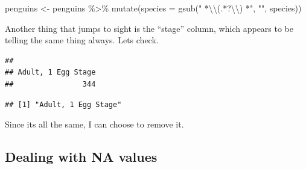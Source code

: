 \documentclass[
]{book}
\newenvironment{Shaded}{\begin{snugshade}}{\end{snugshade}}
\newcommand{\AttributeTok}[1]{\textcolor[rgb]{0.77,0.63,0.00}{#1}}
\newcommand{\ConstantTok}[1]{\textcolor[rgb]{0.00,0.00,0.00}{#1}}
\newcommand{\FunctionTok}[1]{\textcolor[rgb]{0.00,0.00,0.00}{#1}}
\newcommand{\NormalTok}[1]{#1}
\newcommand{\OtherTok}[1]{\textcolor[rgb]{0.56,0.35,0.01}{#1}}
\newcommand{\SpecialCharTok}[1]{\textcolor[rgb]{0.00,0.00,0.00}{#1}}
\newcommand{\StringTok}[1]{\textcolor[rgb]{0.31,0.60,0.02}{#1}}
\begin{document}
\begin{Shaded}
\begin{Highlighting}[]
\NormalTok{penguins }\OtherTok{\textless{}{-}}\NormalTok{ penguins }\SpecialCharTok{\%\textgreater{}\%} 
  \FunctionTok{mutate}\NormalTok{(}\AttributeTok{species =} \FunctionTok{gsub}\NormalTok{(}\StringTok{" *}\SpecialCharTok{\textbackslash{}\textbackslash{}}\StringTok{(.*?}\SpecialCharTok{\textbackslash{}\textbackslash{}}\StringTok{) *"}\NormalTok{, }\StringTok{""}\NormalTok{, species))}
\end{Highlighting}
\end{Shaded}

Another thing that jumps to sight is the ``stage'' column, which appears to be telling the same thing always.
Lets check.

\begin{Shaded}
\end{Shaded}

\begin{verbatim}
## 
## Adult, 1 Egg Stage 
##                344
\end{verbatim}

\begin{Shaded}
\end{Shaded}

\begin{verbatim}
## [1] "Adult, 1 Egg Stage"
\end{verbatim}

Since its all the same, I can choose to remove it.

\begin{Shaded}
\end{Shaded}

\hypertarget{dealing-with-na-values}{%
\subsection{Dealing with NA values}\label{dealing-with-na-values}}
\end{document}
